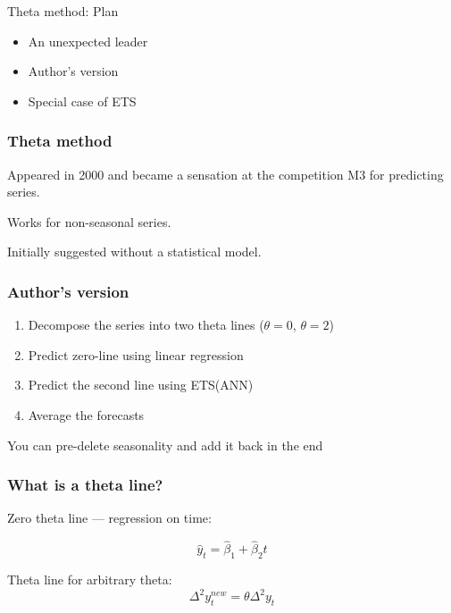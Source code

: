
\begin{frame} %
	
	
\end{frame}


\begin{frame}{Theta method: Plan}
	\begin{itemize}[<+->]
		\item An unexpected leader
		\item Author's version
		\item Special case of ETS
	\end{itemize}
\end{frame}


\begin{frame}
	\frametitle{Theta method}
	
	Appeared in 2000 and became a sensation at the \alert{competition M3} for predicting series.
	
	\pause
	
	Works for \alert{non-seasonal} series.
	
	\pause
	
	Initially suggested \alert{without a statistical model}.
	
\end{frame}


\begin{frame}
	\frametitle{Author's version}
	
	\begin{enumerate}[<+->]
		\item Decompose the series into two \alert{theta lines} ($\theta=0$, $\theta = 2$) 
		\item Predict zero-line using linear regression 
		\item Predict the second line using ETS(ANN)
		\item Average the forecasts
	\end{enumerate}
	
	\pause
	You can pre-delete seasonality and add it back in the end
	
\end{frame}

\begin{frame}
	\frametitle{What is a theta line?}
	
	Zero theta line — \alert{regression} on time:
	
	\[
	\hat y_t = \hat \beta_1 + \hat \beta_2 t
	\]
	\pause
	
	Theta line for arbitrary theta:
	\[
	\Delta^2 y^{new}_t = \theta \Delta^2 y_t
	\]
	
\end{frame}


